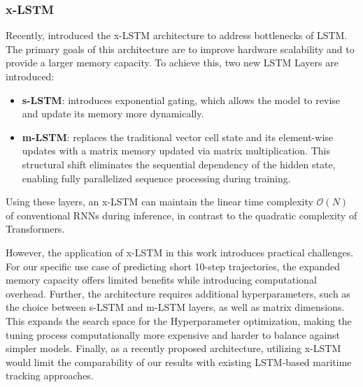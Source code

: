 
    \subsubsection{x-LSTM} 

    Recently, \cite{beck2024xlstmextendedlongshortterm} introduced the \ac{x-LSTM} architecture to address bottlenecks of \ac{LSTM}. The primary goals of this architecture are to improve hardware scalability and to provide a larger memory capacity. To achieve this, two new \ac{LSTM} Layers are introduced:
    
    \begin{itemize}
        \item \textbf{\ac{s-LSTM}}: introduces exponential gating, which allows the model to revise and update its memory more dynamically.
        \item \textbf{\ac{m-LSTM}}: replaces the traditional vector cell state and its element-wise updates with a matrix memory updated via matrix multiplication. This structural shift eliminates the sequential dependency of the hidden state, enabling fully parallelized sequence processing during training.
    \end{itemize}
    Using these layers, an \ac{x-LSTM} can maintain the linear time complexity $\mathcal{O}(N)$ of conventional \acp{RNN} during inference, in contrast to the quadratic complexity of Transformers. \cite{beck2024xlstmextendedlongshortterm, attentioniayn} %
    
    However, the application of \ac{x-LSTM} in this work introduces practical challenges. For our specific use case of predicting short 10-step trajectories, the expanded memory capacity offers limited benefits while introducing computational overhead. Further, the architecture requires additional hyperparameters, such as the choice between \ac{s-LSTM} and \ac{m-LSTM} layers, as well as matrix dimensions. %
    This expands the search space for the Hyperparameter optimization, making the tuning process computationally more expensive and harder to balance against simpler models. Finally, as a recently proposed architecture, utilizing \ac{x-LSTM} would limit the comparability of our results with existing \ac{LSTM}-based maritime tracking approaches. 
  
